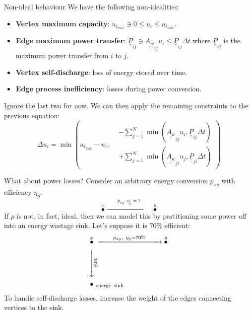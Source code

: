 \documentclass{beamer}
\begin{document}
\begin{frame}{Non-ideal behaviour}
    We have the following non-idealities:
    \begin{itemize}
        \item \textbf{Vertex maximum capacity}: $u_{i_{max}} \ni 0\leq u_{i} \leq u_{i_{max}}$.
        \item \textbf{Edge maximum power transfer}: $\underline{\underline{P}}_{ij} \ni \underline{\underline{A_w}}_{ij} u_i \leq \underline{\underline{P}}_{ij} \varDelta t$ where $\underline{\underline{P}}_{ij}$ is the maximum power transfer from $i$ to $j$.
        \item \textbf{Vertex self-discharge}: loss of energy stored over time.
        \item \textbf{Edge process inefficiency}: losses during power conversion.
    \end{itemize}
    Ignore the last two for now. We can then apply the remaining constraints to the previous equation:
    $$
        \varDelta u_i = \min \left( u_{i_{\mathrm{max}}}-u_i, \begin{aligned}
             & -\sum_{j=1}^{N} \min (\underline{\underline{A_w}}_{ij} u_i, \underline{\underline{P}}_{ij} \varDelta t) \\
             & +\sum_{j=1}^{N} \min (\underline{\underline{A_w}}_{ji} u_j, \underline{\underline{P}}_{ji} \varDelta t)
        \end{aligned} \right)
    $$
\end{frame}
\begin{frame}{What about power losses?}
    Consider an arbitrary energy conversion $p_{xy}$ with efficiency $\eta_p$.
    $$\overset{x}{\bullet}\xrightarrow{\qquad p_{xy},\ \eta_p = 1\qquad}\overset{y}{\bullet}$$
    If $p$ is not, in fact, ideal, then we can model this by partitioning some power off into an energy wastage sink.
    Let's suppose it is 70\% efficient:
    $$
        \begin{aligned}
             & \overset{x}{\bullet}\ \xrightarrow{\qquad p_{xy},\ \eta_p=70\%\qquad}\overset{y}{\bullet} \\
             & \rotatebox[origin=c]{270}{$\xrightarrow{\quad 30\%\quad}$}                                \\
             & \bullet_{\ \mathrm{energy\ sink}}
        \end{aligned}
    $$
    To handle self-discharge losses, increase the weight of the edges connecting vertices to the sink.
\end{frame}
\end{document}
